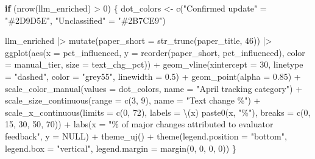 \documentclass[
  11pt,
  letterpaper,
]{article}
\newenvironment{Shaded}{\begin{snugshade}}{\end{snugshade}}
\newcommand{\AttributeTok}[1]{\textcolor[rgb]{0.40,0.45,0.13}{#1}}
\newcommand{\ConstantTok}[1]{\textcolor[rgb]{0.56,0.35,0.01}{#1}}
\newcommand{\ControlFlowTok}[1]{\textcolor[rgb]{0.00,0.23,0.31}{\textbf{#1}}}
\newcommand{\DecValTok}[1]{\textcolor[rgb]{0.68,0.00,0.00}{#1}}
\newcommand{\FloatTok}[1]{\textcolor[rgb]{0.68,0.00,0.00}{#1}}
\newcommand{\FunctionTok}[1]{\textcolor[rgb]{0.28,0.35,0.67}{#1}}
\newcommand{\NormalTok}[1]{\textcolor[rgb]{0.00,0.23,0.31}{#1}}
\newcommand{\OtherTok}[1]{\textcolor[rgb]{0.00,0.23,0.31}{#1}}
\newcommand{\SpecialCharTok}[1]{\textcolor[rgb]{0.37,0.37,0.37}{#1}}
\newcommand{\StringTok}[1]{\textcolor[rgb]{0.13,0.47,0.30}{#1}}
\begin{document}
\begin{Shaded}
\begin{Highlighting}[]
\ControlFlowTok{if}\NormalTok{ (}\FunctionTok{nrow}\NormalTok{(llm\_enriched) }\SpecialCharTok{\textgreater{}} \DecValTok{0}\NormalTok{) \{}
\NormalTok{  dot\_colors }\OtherTok{\textless{}{-}} \FunctionTok{c}\NormalTok{(}\StringTok{"Confirmed update"} \OtherTok{=} \StringTok{"\#2D9D5E"}\NormalTok{, }\StringTok{"Unclassified"} \OtherTok{=} \StringTok{"\#2B7CE9"}\NormalTok{)}

\NormalTok{  llm\_enriched }\SpecialCharTok{|\textgreater{}}
    \FunctionTok{mutate}\NormalTok{(}\AttributeTok{paper\_short =} \FunctionTok{str\_trunc}\NormalTok{(paper\_title, }\DecValTok{46}\NormalTok{)) }\SpecialCharTok{|\textgreater{}}
    \FunctionTok{ggplot}\NormalTok{(}\FunctionTok{aes}\NormalTok{(}\AttributeTok{x =}\NormalTok{ pct\_influenced, }\AttributeTok{y =} \FunctionTok{reorder}\NormalTok{(paper\_short, pct\_influenced),}
               \AttributeTok{color =}\NormalTok{ manual\_tier, }\AttributeTok{size =}\NormalTok{ text\_chg\_pct)) }\SpecialCharTok{+}
    \FunctionTok{geom\_vline}\NormalTok{(}\AttributeTok{xintercept =} \DecValTok{30}\NormalTok{, }\AttributeTok{linetype =} \StringTok{"dashed"}\NormalTok{, }\AttributeTok{color =} \StringTok{"grey55"}\NormalTok{, }\AttributeTok{linewidth =} \FloatTok{0.5}\NormalTok{) }\SpecialCharTok{+}
    \FunctionTok{geom\_point}\NormalTok{(}\AttributeTok{alpha =} \FloatTok{0.85}\NormalTok{) }\SpecialCharTok{+}
    \FunctionTok{scale\_color\_manual}\NormalTok{(}\AttributeTok{values =}\NormalTok{ dot\_colors, }\AttributeTok{name =} \StringTok{"April tracking category"}\NormalTok{) }\SpecialCharTok{+}
    \FunctionTok{scale\_size\_continuous}\NormalTok{(}\AttributeTok{range =} \FunctionTok{c}\NormalTok{(}\DecValTok{3}\NormalTok{, }\DecValTok{9}\NormalTok{), }\AttributeTok{name =} \StringTok{"Text change \%"}\NormalTok{) }\SpecialCharTok{+}
    \FunctionTok{scale\_x\_continuous}\NormalTok{(}\AttributeTok{limits =} \FunctionTok{c}\NormalTok{(}\DecValTok{0}\NormalTok{, }\DecValTok{72}\NormalTok{), }\AttributeTok{labels =}\NormalTok{ \textbackslash{}(x) }\FunctionTok{paste0}\NormalTok{(x, }\StringTok{"\%"}\NormalTok{),}
                       \AttributeTok{breaks =} \FunctionTok{c}\NormalTok{(}\DecValTok{0}\NormalTok{, }\DecValTok{15}\NormalTok{, }\DecValTok{30}\NormalTok{, }\DecValTok{50}\NormalTok{, }\DecValTok{70}\NormalTok{)) }\SpecialCharTok{+}
    \FunctionTok{labs}\NormalTok{(}\AttributeTok{x =} \StringTok{"\% of major changes attributed to evaluator feedback"}\NormalTok{, }\AttributeTok{y =} \ConstantTok{NULL}\NormalTok{) }\SpecialCharTok{+}
    \FunctionTok{theme\_uj}\NormalTok{() }\SpecialCharTok{+}
    \FunctionTok{theme}\NormalTok{(}\AttributeTok{legend.position =} \StringTok{"bottom"}\NormalTok{, }\AttributeTok{legend.box =} \StringTok{"vertical"}\NormalTok{,}
          \AttributeTok{legend.margin =} \FunctionTok{margin}\NormalTok{(}\DecValTok{0}\NormalTok{, }\DecValTok{0}\NormalTok{, }\DecValTok{0}\NormalTok{, }\DecValTok{0}\NormalTok{))}
\NormalTok{\}}
\end{Highlighting}
\end{Shaded}
\end{document}
